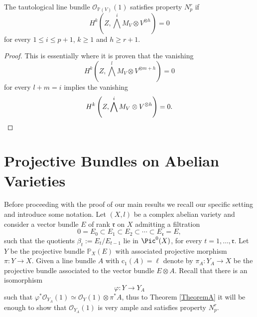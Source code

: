 \documentclass[11pt,letter]{amsart}
\numberwithin{equation}{section}
\begin{document}
\begin{prop}\label{PARK}
    The tautological line bundle $\mathcal{O}_{\mathbb{P}(V)}(1)$ satisfies property $N_p^r$
 if 
 \[H^k\left(Z,\bigwedge^iM_V\otimes V^{\otimes h}\right)=0\]
 for every $1\leq i\leq p+1 $, $k\geq 1$ and $h\geq r+1.$
 \end{prop}
 \begin{proof}
     This is essentially \cite[Prop. 3.2]{Park} where  it is proven that the vanishing 
      \[H^k\left(Z,\bigwedge^lM_V\otimes V^{\otimes m+h}\right)=0\]
      for every $l+m=i$ implies the vanishing
       \[H^k\left(Z,\bigwedge^iM_V\otimes V^{\otimes h}\right)=0. \qedhere\]
 \end{proof}
\section{Projective Bundles on Abelian Varieties}\label{sec4}
Before proceeding with the proof of our main results we recall our specific setting and introduce some notation. Let $(X,l)$ be a complex abelian variety and consider a vector bundle $E$ of rank $\mathfrak{r}$ on $X$ admitting a filtration
\begin{equation}\label{eq:filtration}
    0=E_0\subset E_1\subset E_2\subset\cdots\subset E_\mathfrak{r}=E,
\end{equation}
such that the quotients
$\beta_t:=E_t/E_{t-1}$ lie in $\Pic^0(X)$, for every $t=1,\ldots,\mathfrak{r}$.
Let $Y$ be the projective bundle $\mathbb{P}_X(E)$ with associated projective morphism $\pi:Y\rightarrow X$. Given a line bundle $A$ with $\mathrm{c}_1(A)=\ell$ denote by $\pi_A:Y_A\rightarrow X$ be the projective bundle associated to the vector bundle $E\otimes A$. Recall that there is an isomorphism 
\[\varphi:Y \rightarrow Y_A\]
such that $\varphi^*\mathcal{O}_{Y_A}(1)\simeq \mathcal{O}_{Y}(1)\otimes \pi^*A$, thus to Theorem \ref{TheoremA} it will be enough to show that $\mathcal{O}_{Y_A}(1)$ is very ample and satisfies property $N_p^r$. 
\end{document}
